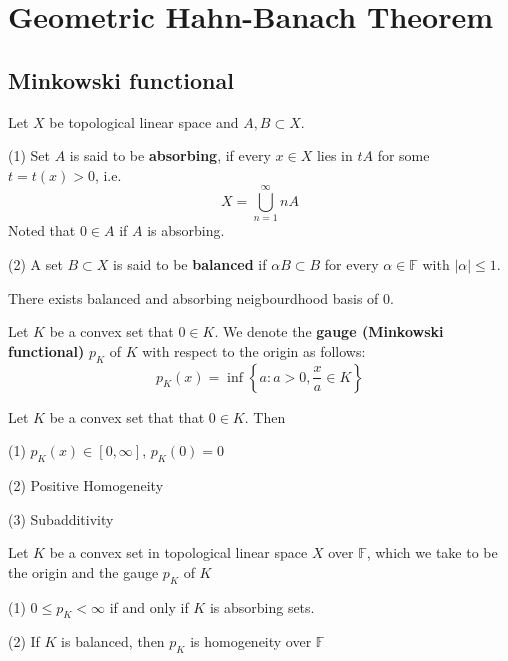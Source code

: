 \documentclass[12pt, oneside]{book}
\begin{document}
\section{Geometric Hahn-Banach Theorem} %

\subsection{Minkowski functional}

\begin{definition}
    Let $X$ be topological linear space and $A,B \subset X$.

    (1) Set $A$ is said to be \textbf{absorbing}, if every $x \in X$ lies in $t A$ for some $t=t(x)>0$, i.e.
    \begin{equation*}
        X=\bigcup_{n=1}^\infty nA
    \end{equation*}
    Noted that $0\in A$ if $A$ is absorbing.

    (2) A set $B \subset X$ is said to be \textbf{balanced} if $\alpha B \subset B$ for every $\alpha \in \mathbb{F}$ with $|\alpha| \leq 1$.
\end{definition}

\begin{proposition}
    There exists balanced and absorbing neigbourdhood basis of $0$.
\end{proposition}


\begin{definition}
    Let $K$ be a convex set that $ {0}\in K$.
    We denote the \textbf{gauge (Minkowski functional)} $p_K$ of $K$ with respect to the origin as follows:
    \begin{equation*}
        p_K(x)
        =
        \inf \left\{a : a>0, \frac{x}{a} \in K\right\}
    \end{equation*}
\end{definition}
\begin{proposition}
    Let $K$ be a convex set that that $ {0}\in K$. Then

    (1) $p_K(x) \in [0,\infty]$, $p_K( {0}) =0 $

    (2) Positive Homogeneity

    (3) Subadditivity
\end{proposition}

\begin{proposition}
    Let $K$ be a convex set in topological linear space $X$ over $\mathbb{F}$, which we take to be the origin and the gauge $p_K$ of $K$

    (1) $0\leq p_K <\infty$ if and only if $K$ is absorbing sets.

    (2) If $K$ is balanced, then $p_K$ is homogeneity over $\mathbb{F}$
\end{proposition}
\end{document}
